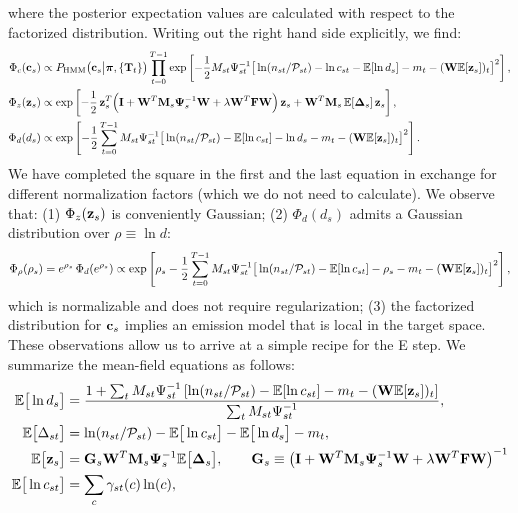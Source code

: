 \documentclass[nofootinbib,amssymb,amsmath]{revtex4}
\newcommand{\vI}{{\bf I}}
\newcommand{\vc}{{\bf c}}
\newcommand{\vz}{{\bf z}}
\newcommand{\vG}{{\bf G}}
\newcommand{\vM}{{\bf M}}
\newcommand{\vW}{{\bf W}}
\newcommand{\vF}{{\bf F}}
\newcommand{\vPsi}{{\bf \Psi}}
\newcommand{\vpi}{{\boldsymbol \pi}}
\newcommand{\PP}{\mathcal{P}}
\newcommand{\EE}{\mathbb{E}}
\begin{document}
where the posterior expectation values are calculated with respect to the factorized distribution. Writing out the right hand side explicitly, we find:
\begin{align}
\Phi_c(\vc_s) &\propto P_\mathrm{HMM}\big(\vc_s \big|\vpi, \{\mathbf{T}_t\}\big)\prod_{t=0}^{T-1} \exp\left[- \frac{1}{2} M_{st}\Psi_{st}^{-1}\big[\ln(n_{st}/\PP_{st}) - \ln c_{st} - \EE[\ln d_s] - m_t - (\vW \EE[\vz_s])_t\big]^2\right],\\
\Phi_z(\vz_s) &\propto \exp\left[-\frac{1}{2} \, \vz_s^T \Big(\vI + \vW^T \vM_s \vPsi_s^{-1}\vW + \lambda \vW^T \vF \vW \Big)\,\vz_s + \vW^T \vM_{s} \, \EE[\mathbf{\Delta}_{s}]\,\vz_s \right],\\
\Phi_d(d_s) &\propto \exp\left[- \frac{1}{2} \sum_{t=0}^{T-1} M_{st}\Psi_{st}^{-1}\big[\ln(n_{st}/\PP_{st}) - \EE[\ln c_{st}] - \ln d_s - m_t - (\vW \EE[\vz_s])_t\big]^2\right].
\end{align}
We have completed the square in the first and the last equation in exchange for different normalization factors (which we do not need to calculate). We observe that: (1) $\Phi_z(\vz_s)$ is conveniently Gaussian; (2) $\Phi_d(d_s)$ admits a Gaussian distribution over $\rho \equiv \ln d$:
\begin{equation}
\Phi_\rho(\rho_s) = e^{\rho_s}\,\Phi_d(e^{\rho_s}) \propto \exp\left[ \rho_s - \frac{1}{2} \sum_{t=0}^{T-1} M_{st}\Psi_{st}^{-1}\big[\ln(n_{st}/\PP_{st}) - \EE[\ln c_{st}] - \rho_s - m_t - (\vW \EE[\vz_s])_t\big]^2\right],
\end{equation}
which is normalizable and does not require regularization; (3) the factorized distribution for $\vc_s$  implies an emission model that is local in the target space. These observations allow us to arrive at a simple recipe for the E step. We summarize the mean-field equations as follows:
\begin{subequations}
\begin{align}
\EE\big[\ln d_s \big] &= \frac{1 + \sum_t M_{st} \Psi_{st}^{-1}\left[\ln(n_{st}/\PP_{st}) - \EE[\ln c_{st}] - m_t - (\vW \EE[\vz_s])_t\right]}{\sum_t M_{st} \Psi_{st}^{-1}},\nonumber\\
\EE\big[\Delta_{st}\big] &= \ln(n_{st}/\PP_{st}) - \EE\big[\ln c_{st}\big] - \EE\big[\ln d_s\big] - m_t,\\
\EE\big[\vz_s\big] &= \vG_s \vW^T \vM_s \vPsi_s^{-1} \EE\big[\mathbf{\Delta}_s\big],\qquad \vG_s \equiv \left( \vI + \vW^T \vM_s \vPsi_s^{-1} \vW + \lambda \vW^T \vF \vW \right)^{-1}\\
\EE\big[\ln c_{st}\big] &= \sum_{c} \gamma_{st}(c) \ln(c),
\end{align}
\end{subequations}
\end{document}

